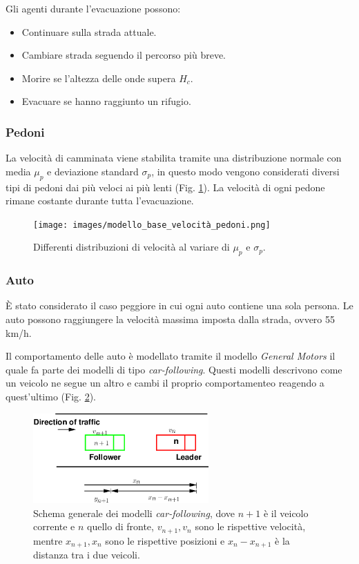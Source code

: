 \vspace*{4mm}

\noindent
Gli agenti durante l'evacuazione possono:
\begin{itemize}
  \item Continuare sulla strada attuale.
  \item Cambiare strada seguendo il percorso più breve.
  \item Morire se l'altezza delle onde supera $H_c$.
  \item Evacuare se hanno raggiunto un rifugio.
\end{itemize}

\subsubsection{Pedoni}
La velocità di camminata viene stabilita tramite una distribuzione normale
con media $\mu_p$ e deviazione standard $\sigma_p$, in questo modo vengono considerati diversi
 tipi di pedoni dai più veloci ai più lenti (Fig. \ref{fig:modello-base-velocita-pedoni-img}).
La velocità di ogni pedone rimane costante durante tutta l'evacuazione.

\begin{figure}[ht]
  \centering
  \texttt{[image: images/modello\_base\_velocità\_pedoni.png]}
  \caption{Differenti distribuzioni di velocità al variare di $\mu_p$ e $\sigma_p$.}
  \label{fig:modello-base-velocita-pedoni-img}
\end{figure}

\subsubsection{Auto}
È stato considerato il caso peggiore in cui ogni auto contiene una sola persona.
Le auto possono raggiungere la velocità massima imposta dalla strada, ovvero 55 km/h.

Il comportamento delle auto è modellato tramite il modello \textit{General Motors} il quale fa parte dei modelli
di tipo \textit{car-following}. Questi modelli descrivono come un veicolo ne segue un altro
e cambi il proprio comportamenteo reagendo a quest'ultimo (Fig. \ref{fig:general-motors-img}).

\begin{figure}[ht]
  \centering
  \includegraphics[width=0.6\textwidth]{images/GM.png}
  \caption{Schema generale dei modelli \textit{car-following}, dove $n+1$ è il veicolo corrente e $n$ quello di fronte, 
  $v_{n+1}, v_{n}$ sono le rispettive velocità, mentre $x_{n+1}, x_{n}$ sono le rispettive posizioni e $x_{n} - x_{n + 1}$ è la distanza tra i due veicoli.}
  \label{fig:general-motors-img}
\end{figure}

